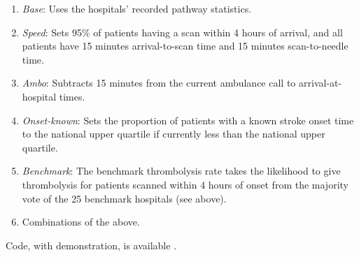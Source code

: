 \begin{enumerate}

    \item \textit{Base}: Uses the hospitals’ recorded pathway statistics.

    \item \textit{Speed}: Sets 95\% of patients having a scan within 4 hours of arrival, and all patients have 15 minutes arrival-to-scan time and 15 minutes scan-to-needle time.

    \item \textit{Ambo}: Subtracts 15 minutes from the current ambulance call to arrival-at-hospital times.

    \item  \textit{Onset-known}: Sets the proportion of patients with a known stroke onset time to the national upper quartile if currently less than the national upper quartile.

    \item \textit{Benchmark}: The benchmark thrombolysis rate takes the likelihood to give thrombolysis for patients scanned within 4 hours of onset from the majority vote of the 25 benchmark hospitals (see above).

    \item Combinations of the above.
    
\end{enumerate}

Code, with demonstration, is available \cite{allen_samuel_code_2024}.